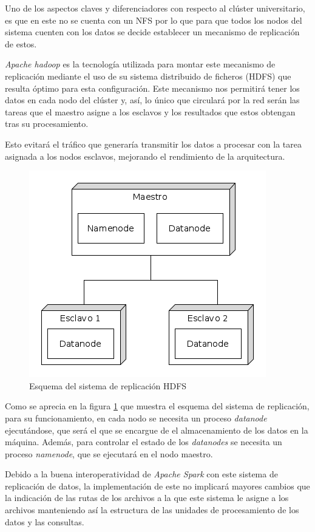 Uno de los aspectos claves y diferenciadores con respecto al clúster universitario, es que en este no se cuenta con un \gls{NFS} por lo que para que todos los nodos del sistema cuenten con los datos se decide establecer un mecanismo de replicación de estos.

\textit{Apache hadoop} es la tecnología utilizada para montar este mecanismo de replicación mediante el uso de su sistema distribuido de ficheros (\gls{HDFS}) que resulta óptimo para esta configuración. Este mecanismo nos permitirá tener los datos en cada nodo del clúster y, así, lo único que circulará por la red serán las tareas que el maestro asigne a los esclavos y los resultados que estos obtengan tras su procesamiento. 

Esto evitará el tráfico que generaría transmitir los datos a procesar con la tarea asignada a los nodos esclavos, mejorando el rendimiento de la arquitectura.

\begin{figure}[htp!]
\centering
\caption{Esquema del sistema de replicación \gls{HDFS}}
\label{fig:hdfs}
\includegraphics[scale=0.6]{diagramas/hadoop}
\end{figure}

Como se aprecia en la figura \ref{fig:hdfs} que muestra el esquema del sistema de replicación, para su funcionamiento, en cada nodo se necesita un proceso \textit{datanode} ejecutándose, que será el que se encargue de el almacenamiento de los datos en la máquina. Además, para controlar el estado de los \textit{datanodes} se necesita un proceso \textit{namenode}, que se ejecutará en el nodo maestro.

Debido a la buena interoperatividad de \textit{Apache Spark} con este sistema de replicación de datos, la implementación de este no implicará mayores cambios que la indicación de las rutas de los archivos a la que este sistema le asigne a los archivos manteniendo así la estructura de las unidades de procesamiento de los datos y las consultas.

